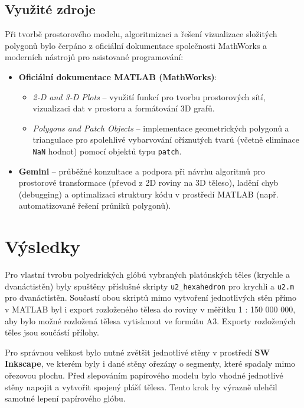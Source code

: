\documentclass[12pt, a4paper]{article}
\begin{document}
\subsection{Využité zdroje}
Při tvorbě prostorového modelu, algoritmizaci a řešení vizualizace složitých polygonů bylo čerpáno z oficiální dokumentace společnosti MathWorks a moderních nástrojů pro asistované programování:
\begin{itemize}
    \item \textbf{Oficiální dokumentace MATLAB (MathWorks)}:
    \begin{itemize}
        \item \textit{2-D and 3-D Plots} -- využití funkcí pro tvorbu prostorových sítí, vizualizaci dat v prostoru a formátování 3D grafů.
        \item \textit{Polygons and Patch Objects} -- implementace geometrických polygonů a triangulace pro spolehlivé vybarvování oříznutých tvarů (včetně eliminace \texttt{NaN} hodnot) pomocí objektů typu \texttt{patch}.
    \end{itemize}
    \item \textbf{Gemini} -- průběžné konzultace a podpora při návrhu algoritmů pro prostorové transformace (převod z 2D roviny na 3D těleso), ladění chyb (debugging) a optimalizaci struktury kódu v prostředí MATLAB (např. automatizované řešení průniků polygonů).
    
\end{itemize}

\clearpage
\newpage

\section{Výsledky}
Pro vlastní tvrobu polyedrických glóbů vybraných platónských těles (krychle a dvanáctistěn) byly spuštěny příslušné skripty \texttt{u2\_hexahedron} pro krychli a \texttt{u2.m} pro dvanáctistěn. Součastí obou skriptů mimo vytvoření jednotlivých stěn přímo v MATLAB byl i export rozloženého tělesa do roviny v měřítku 1 : 150 000 000, aby bylo možné rozložená tělesa vytisknout ve formátu A3. Exporty rozložených těles jsou součástí přílohy. 

Pro správnou velikost bylo nutné zvětšit jednotlivé stěny v prostředí \textbf{SW Inkscape}, ve kterém byly i dané stěny ořezány o segmenty, které spadaly mimo ořezovou plochu. Před slepováním papírového modelu bylo vhodné jednotlivé stěny napojit a vytvořit spojený plášť tělesa. Tento krok by výrazně ulehčil samotné lepení papírového glóbu.
\end{document}
